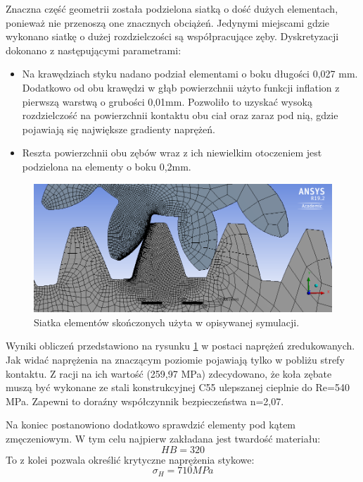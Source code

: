 Znaczna część geometrii została podzielona siatką o dość dużych elementach, ponieważ nie przenoszą one znacznych obciążeń.
Jedynymi miejscami gdzie wykonano siatkę o dużej rozdzielczości są współpracujące zęby.
Dyskretyzacji dokonano z następującymi parametrami:
\begin{itemize}
	\item Na krawędziach styku nadano podział elementami o boku długości 0,027 mm. 
	Dodatkowo od obu krawędzi w głąb powierzchnii użyto funkcji inflation z pierwszą warstwą o grubości 0,01mm.
	Pozwoliło to uzyskać wysoką rozdzielczość na powierzchnii kontaktu obu ciał oraz zaraz pod nią, gdzie pojawiają się największe gradienty naprężeń.
	\item Reszta powierzchnii obu zębów wraz z ich niewielkim otoczeniem jest podzielona na elementy o boku 0,2mm.
	
\end{itemize}

\begin{figure}[bh]
	\centering
	\includegraphics[width=0.9\linewidth]{Obliczenia/siatka_przekladnia}
	\caption{Siatka elementów skończonych użyta w opisywanej symulacji.} 
	\label{fig::geometria_plus_BC_przekladnia}
\end{figure}

Wyniki obliczeń przedstawiono na rysunku \ref{fig::geometria_plus_BC_przekladnia} w postaci naprężeń zredukowanych.
Jak widać naprężenia na znaczącym poziomie pojawiają tylko w pobliżu strefy kontaktu.
Z racji na ich wartość (259,97 MPa) zdecydowano, że koła zębate muszą być wykonane ze stali konstrukcyjnej C55 ulepszanej cieplnie do Re=540 MPa.
Zapewni to doraźny współczynnik bezpieczeństwa n=2,07.

Na koniec postanowiono dodatkowo sprawdzić elementy pod kątem zmęczeniowym.
W tym celu najpierw zakładana jest twardość materiału:
\begin{equation}
HB=320
\end{equation} 
To z kolei pozwala określić krytyczne naprężenia stykowe:
\begin{equation}
\sigma_H = 710MPa
\end{equation} 

